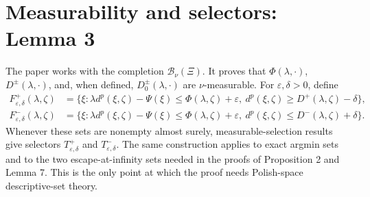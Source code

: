 \section{Measurability and selectors: Lemma 3}
The paper works with the completion \(\mathcal B_\nu(\Xi)\).  It proves that
\(\Phi(\lambda,\cdot)\), \(D^\pm(\lambda,\cdot)\), and, when defined,
\(D_0^\pm(\lambda,\cdot)\) are \(\nu\)-measurable.  For \(\varepsilon,\delta>0\), define
\begin{align*}
 F^+_{\varepsilon,\delta}(\lambda,\zeta)
 &=\{\xi: \lambda d^p(\xi,\zeta)-\Psi(\xi)
       \le\Phi(\lambda,\zeta)+\varepsilon,
       \ d^p(\xi,\zeta)\ge D^+(\lambda,\zeta)-\delta\},\\
 F^-_{\varepsilon,\delta}(\lambda,\zeta)
 &=\{\xi: \lambda d^p(\xi,\zeta)-\Psi(\xi)
       \le\Phi(\lambda,\zeta)+\varepsilon,
       \ d^p(\xi,\zeta)\le D^-(\lambda,\zeta)+\delta\}.
\end{align*}
Whenever these sets are nonempty almost surely, measurable-selection results give selectors
\(T^+_{\varepsilon,\delta}\) and \(T^-_{\varepsilon,\delta}\).  The same construction applies to exact
argmin sets and to the two escape-at-infinity sets needed in the proofs of Proposition 2 and Lemma 7.
This is the only point at which the proof needs Polish-space descriptive-set theory.

